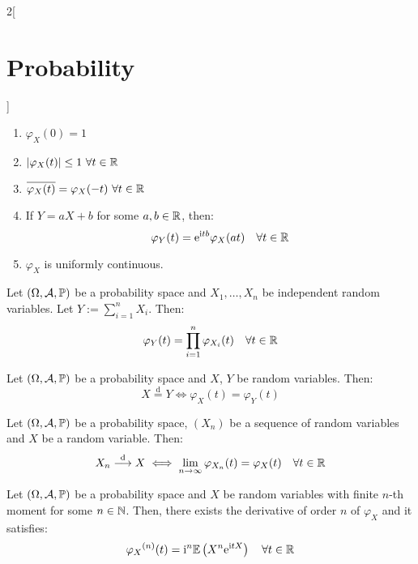 \documentclass[../../../main.tex]{subfiles}
\begin{document}
\begin{multicols}{2}[\section{Probability}]
\begin{prop}
\begin{enumerate}
            \item $\varphi_X(0)=1$
            \item $|\varphi_X(t)|\leq 1\ \forall t\in\mathbb{R}$
            \item $\overline{\varphi_X(t)}=\varphi_X(-t)\ \forall t\in\RR$
            \item If $Y=aX+b$ for some $a,b\in \mathbb{R}$, then: $$\varphi_Y(t)=\mathrm{e}^{\mathrm{i} t b}\varphi_X(at)\quad\forall t\in\mathbb{R}$$
            \item $\varphi_X$ is uniformly continuous.
        \end{enumerate}
    \end{prop}
    \begin{theorem}
        Let $(\Omega,\mathcal{A},\mathbb{P})$ be a probability space and $X_1,\ldots,X_n$ be independent random variables. Let $Y:=\sum_{i=1}^n X_i$. Then: $$\varphi_Y(t)=\prod_{i=1}^n\varphi_{X_i}(t)\quad\forall t\in\mathbb{R}$$
    \end{theorem}
    \begin{theorem}
        Let $(\Omega,\mathcal{A},\mathbb{P})$ be a probability space and $X$, $Y$ be random variables. Then: $$X\overset{\text{d}}{=}Y\iff \varphi_X(t)=\varphi_Y(t)$$
    \end{theorem}
    \begin{theorem}
        Let $(\Omega,\mathcal{A},\mathbb{P})$ be a probability space, $(X_n)$ be a sequence of random variables and $X$ be a random variable. Then:
        $$X_n\overset{\text{d}}{\longrightarrow} X\iff\lim_{n\to\infty}\varphi_{X_n}(t)=\varphi_X(t)\quad\forall t\in\mathbb{R}$$
    \end{theorem}
    \begin{prop}
        Let $(\Omega,\mathcal{A},\mathbb{P})$ be a probability space and $X$ be random variables with finite $n$-th moment for some $n\in\mathbb{N}$. Then, there exists the derivative of order $n$ of $\varphi_X$ and it satisfies: $${\varphi_X}^{(n)}(t)=\mathrm{i}^n\mathbb{E}\left(X^n\mathrm{e}^{\mathrm{i} t X}\right)\quad\forall t\in\mathbb{R}$$
    \end{prop}

\end{multicols}
\end{document}
